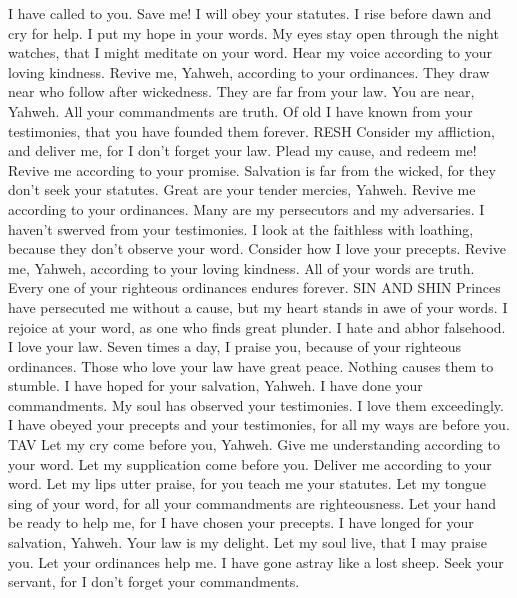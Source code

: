  I have called to you. Save me! I will obey your
statutes.  I rise before dawn and cry for help. I put my
hope in your words.  My eyes stay open through the night
watches, that I might meditate on your word.  Hear my
voice according to your loving kindness. Revive me, Yahweh, according to
your ordinances.  They draw near who follow after
wickedness. They are far from your law.  You are near,
Yahweh. All your commandments are truth.  Of old I have
known from your testimonies, that you have founded them forever. RESH
 Consider my affliction, and deliver me, for I don't
forget your law.  Plead my cause, and redeem me! Revive
me according to your promise.  Salvation is far from the
wicked, for they don't seek your statutes.  Great are
your tender mercies, Yahweh. Revive me according to your ordinances.
 Many are my persecutors and my adversaries. I haven't
swerved from your testimonies.  I look at the faithless
with loathing, because they don't observe your word. 
Consider how I love your precepts. Revive me, Yahweh, according to your
loving kindness.  All of your words are truth. Every one
of your righteous ordinances endures forever. SIN AND SHIN
 Princes have persecuted me without a cause, but my
heart stands in awe of your words.  I rejoice at your
word, as one who finds great plunder.  I hate and abhor
falsehood. I love your law.  Seven times a day, I praise
you, because of your righteous ordinances.  Those who
love your law have great peace. Nothing causes them to stumble.
 I have hoped for your salvation, Yahweh. I have done
your commandments.  My soul has observed your
testimonies. I love them exceedingly.  I have obeyed
your precepts and your testimonies, for all my ways are before you. TAV
 Let my cry come before you, Yahweh. Give me
understanding according to your word.  Let my
supplication come before you. Deliver me according to your word.
 Let my lips utter praise, for you teach me your
statutes.  Let my tongue sing of your word, for all your
commandments are righteousness.  Let your hand be ready
to help me, for I have chosen your precepts.  I have
longed for your salvation, Yahweh. Your law is my delight.
 Let my soul live, that I may praise you. Let your
ordinances help me.  I have gone astray like a lost
sheep. Seek your servant, for I don't forget your commandments.

